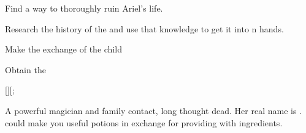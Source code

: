 \documentclass[char]{NeptuneBall}
\begin{document}
\begin{itemz}[Goals]
  \item Find a way to thoroughly ruin Ariel's life.
	\item Research the history of the \pGazaStrip{} and use that knowledge to get it into \pAtlantis{}n hands.
	\item Make the exchange of the child
	\item Obtain the \iGlowShell{\MYname}
\end{itemz}
[][;
\begin{contacts}
  \contact{\cWitch{\MYname}} A powerful magician and family contact, long thought dead. Her real name is \cWitch{}. \cWitch{\They} could make you useful potions in exchange for providing \cWitch{\them} with ingredients.
\end{contacts}
\end{document}
